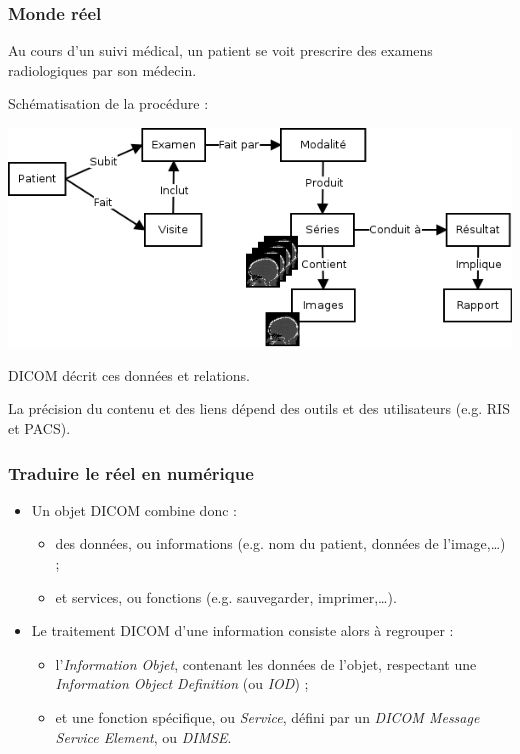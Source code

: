 	\frame
	{
		\frametitle{Monde r\'eel}
		Au cours d'un suivi m\'edical, un patient se voit prescrire des examens radiologiques par son m\'edecin.
		
		Sch\'ematisation de la proc\'edure :
		
		\includegraphics[width=\linewidth]{./figures/scenario.png}
		
		DICOM d\'ecrit ces donn\'ees et relations.
		
		La pr\'ecision du contenu et des liens d\'epend des outils et des utilisateurs (e.g. RIS et PACS).
	}

	\frame
	{
		\frametitle{Traduire le r\'eel en num\'erique}
		
		\begin{itemize}
			\item Un objet DICOM combine donc :
			\begin{itemize}
				\item<2-> des donn\'ees, ou informations (e.g. nom du patient, donn\'ees de l'image,\ldots) ;
				\item<3-> et services, ou fonctions (e.g. sauvegarder, imprimer,\ldots).
			\end{itemize}
			
			\item<4-> Le traitement DICOM d'une information consiste alors \`a regrouper :
			\begin{itemize}
				\item<5-> l'\emph{Information Objet}, contenant les donn\'ees de l'objet, respectant une \emph{Information Object Definition} (ou \emph{IOD}) ;
				\item<6-> et une fonction sp\'ecifique, ou \emph{Service}, d\'efini par un \emph{DICOM Message Service Element}, ou \emph{DIMSE}.
			\end{itemize}
		\end{itemize}
	}
	
